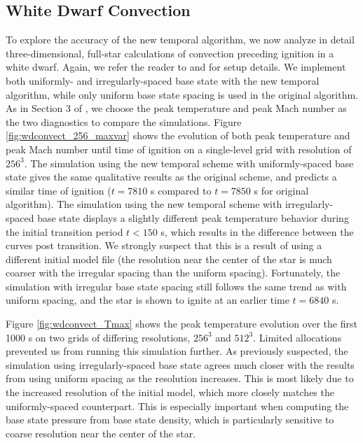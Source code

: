 \subsection{White Dwarf Convection}\label{sec:whitedwarf}

To explore the accuracy of the new temporal algorithm, we now analyze in detail three-dimensional, full-star calculations of convection preceding ignition in a white dwarf. Again, we refer the reader to \cite{MAESTRO_AMR} and \cite{MAESTRO_convection} for setup details. We implement both uniformly- and irregularly-spaced base state with the new temporal algorithm, while only uniform base state spacing is used in the original algorithm. As in Section 3 of \cite{MAESTRO_AMR}, we choose the peak temperature and peak Mach number as the two diagnostics to compare the simulations. Figure \ref{fig:wdconvect_256_maxvar} shows the evolution of both peak temperature and peak Mach number until time of ignition on a single-level grid with resolution of $256^3$. The simulation using the new temporal scheme with uniformly-spaced base state gives the same qualitative results as the original scheme, and predicts a similar time of ignition ($t=7810$ s compared to $t=7850$ s for original algorithm). The simulation using the new temporal scheme with irregularly-spaced base state displays a slightly different peak temperature behavior during the initial transition period $t<150$ s, which results in the difference between the curves post transition. We strongly suspect that this is a result of using a different initial model file (the resolution near the center of the star is much coarser with the irregular spacing than the uniform spacing). Fortunately, the simulation with irregular base state spacing still follows the same trend as with uniform spacing, and the star is shown to ignite at an earlier time $t=6840$ s.

Figure \ref{fig:wdconvect_Tmax} shows the peak temperature evolution over the first 1000 s on two grids of differing resolutions, $256^3$ and $512^3$.
Limited allocations prevented us from running this simulation further.
As previously suspected, the simulation using irregularly-spaced base state agrees much closer with the results from using uniform spacing as the resolution increases.
This is most likely due to the increased resolution of the initial model, which more closely matches the uniformly-spaced counterpart.
This is especially important when computing the base state pressure from base state density, which is particularly sensitive to coarse resolution near the center of the star.

